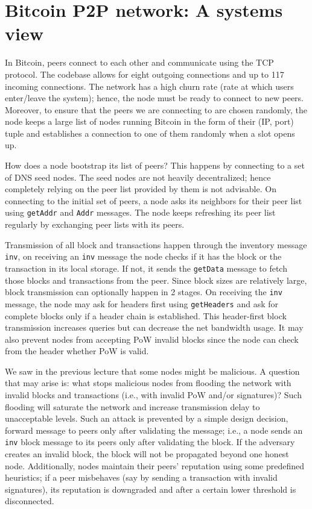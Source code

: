 \documentclass{article}
\begin{document}

\section*{Bitcoin P2P network: A systems view}
In Bitcoin, peers connect to each other and communicate using the TCP protocol. The codebase allows for eight outgoing connections and up to 117 incoming connections. The network has a high churn rate (rate at which users enter/leave the system); hence, the node must be ready to connect to new peers. Moreover, to ensure that the peers we are connecting to are chosen randomly, the node keeps a large list of nodes running Bitcoin in the form of their (IP, port) tuple and establishes a connection to one of them randomly when a slot opens up.  

How does a node bootstrap its list of peers? This happens by connecting to a set of DNS seed nodes. The seed nodes are not heavily decentralized; hence completely relying on the peer list provided by them is not advisable. On connecting to the initial set of peers, a node asks its neighbors for their peer list using {\tt getAddr} and {\tt Addr} messages. The node keeps refreshing its peer list regularly by exchanging peer lists with its peers. 

Transmission of all block and transactions happen through the inventory message {\tt inv}, on receiving an {\tt inv} message the node checks if it has the block or the transaction in its local storage. If not, it sends the {\tt getData} message to fetch those blocks and transactions from the peer. Since block sizes are relatively large, block transmission can optionally happen in 2 stages. On receiving the {\tt inv} message, the node may ask for headers first using {\tt getHeaders} and ask for complete blocks only if a header chain is established. This header-first block transmission increases queries but can decrease the net bandwidth usage. It may also prevent nodes from accepting PoW invalid blocks since the node can check from the header whether PoW is valid. 

We saw in the previous lecture that some nodes might be malicious. A question that may arise is: what stops malicious nodes from flooding the network with invalid blocks and transactions (i.e., with invalid PoW and/or signatures)? Such flooding will saturate the network and increase transmission delay to unacceptable levels. Such an attack is prevented by a simple design decision, forward message to peers only after validating the message; i.e., a node sends an {\tt inv} block message to its peers only after validating the block. If the adversary creates an invalid block, the block will not be propagated beyond one honest node. Additionally, nodes maintain their peers' reputation using some predefined heuristics; if a peer misbehaves (say by sending a transaction with invalid signatures), its reputation is downgraded and after a certain lower threshold is disconnected.  
\end{document}
